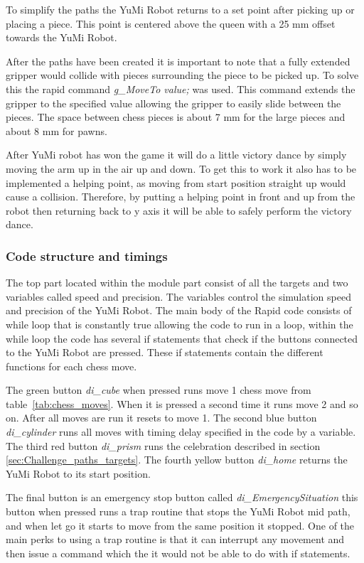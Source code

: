 \documentclass[a4paper,12pt]{article}
\begin{document}
To simplify the paths the YuMi Robot returns to a set point after picking up or placing a piece. This point is centered above the queen with a 25 mm offset towards the YuMi Robot. 

After the paths have been created it is important to note that a fully extended gripper would collide with pieces surrounding the piece to be picked up. To solve this the rapid command \textit{g\_MoveTo value;} was used. This command extends the gripper to the specified value allowing the gripper to easily slide between the pieces. The space between chess pieces is about 7 mm for the large pieces and about 8 mm for pawns.

After YuMi robot has won the game it will do a little victory dance by simply moving the arm up in the air up and down. To get this to work it also has to be implemented a helping point, as moving from start position straight up would cause a collision. Therefore, by putting a helping point in front and up from the robot then returning back to y axis it will be able to safely perform the victory dance. 

\subsubsection{Code structure and timings}
The top part located within the module part consist of all the targets and two variables called speed and precision. The variables control the simulation speed and precision of the YuMi Robot. The main body of the Rapid code consists of while loop that is constantly true allowing the code to run in a loop, within the while loop the code has several if statements that check if the buttons connected to the YuMi Robot are pressed. These if statements contain the different functions for each chess move.

The green button \textit{di\_cube} when pressed runs move 1 chess move from table~\ref{tab:chess_moves}. When it is pressed a second time it runs move 2 and so on. After all moves are run it resets to move 1. The second blue button \textit{di\_cylinder} runs all moves with timing delay specified in the code by a variable. The third red button \textit{di\_prism} runs the celebration described in section \ref{sec:Challenge_paths_targets}. The fourth yellow button \textit{di\_home} returns the YuMi Robot to its start position.

The final button is an emergency stop button called \textit{di\_EmergencySituation} this button when pressed runs a trap routine that stops the YuMi Robot mid path, and when let go it starts to move from the same position it stopped. One of the main perks to using a trap routine is that it can interrupt any movement and then issue a command which the it would not be able to do with if statements.
\end{document}
